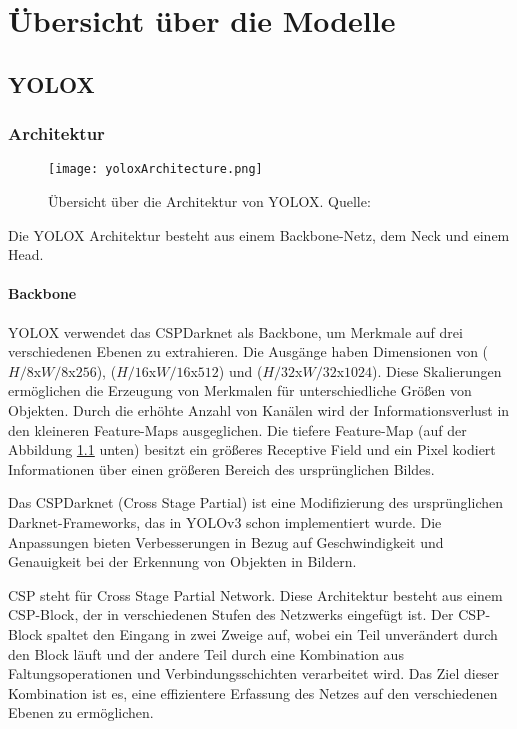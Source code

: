 \chapter{Übersicht über die Modelle}
\section{YOLOX}\label{chap:yolox}
\subsection{Architektur}

\begin{figure}[h]
	\centering
	\texttt{[image: yoloxArchitecture.png]}
	\caption[Übersicht über die Architektur von YOLOX]{Übersicht über die Architektur von YOLOX. Quelle: \cite{yoloArchitecture, yoloxPaper, yoloxGitHubRepo}}
	\label{fig:yoloxArchitecture.png}
\end{figure}

Die YOLOX Architektur besteht aus einem Backbone-Netz, dem Neck und einem Head.

\subsubsection{Backbone}
YOLOX verwendet das CSPDarknet als Backbone, um Merkmale auf drei verschiedenen Ebenen zu extrahieren. Die Ausgänge haben Dimensionen von ($H/8$x$W/8$x$256$), ($H/16$x$W/16$x$512$) und ($H/32$x$W/32$x$1024$). Diese Skalierungen ermöglichen die Erzeugung von Merkmalen für unterschiedliche Größen von Objekten. Durch die erhöhte Anzahl von Kanälen wird der Informationsverlust in den kleineren Feature-Maps ausgeglichen. Die tiefere Feature-Map (auf der Abbildung \ref{fig:yoloxArchitecture.png} unten) besitzt ein größeres Receptive Field und ein Pixel kodiert Informationen über einen größeren Bereich des ursprünglichen Bildes.

Das CSPDarknet (Cross Stage Partial) ist eine Modifizierung des ursprünglichen Darknet-Frameworks, das in YOLOv3 schon implementiert wurde. Die Anpassungen bieten Verbesserungen in Bezug auf Geschwindigkeit und Genauigkeit bei der Erkennung von Objekten in Bildern.

CSP steht für Cross Stage Partial Network. Diese Architektur besteht aus einem CSP-Block, der in verschiedenen Stufen des Netzwerks eingefügt ist. Der CSP-Block spaltet den Eingang in zwei Zweige auf, wobei ein Teil unverändert durch den Block läuft und der andere Teil durch eine Kombination aus Faltungsoperationen und Verbindungsschichten verarbeitet wird. Das Ziel dieser Kombination ist es, eine effizientere Erfassung des Netzes auf den verschiedenen Ebenen zu ermöglichen.

